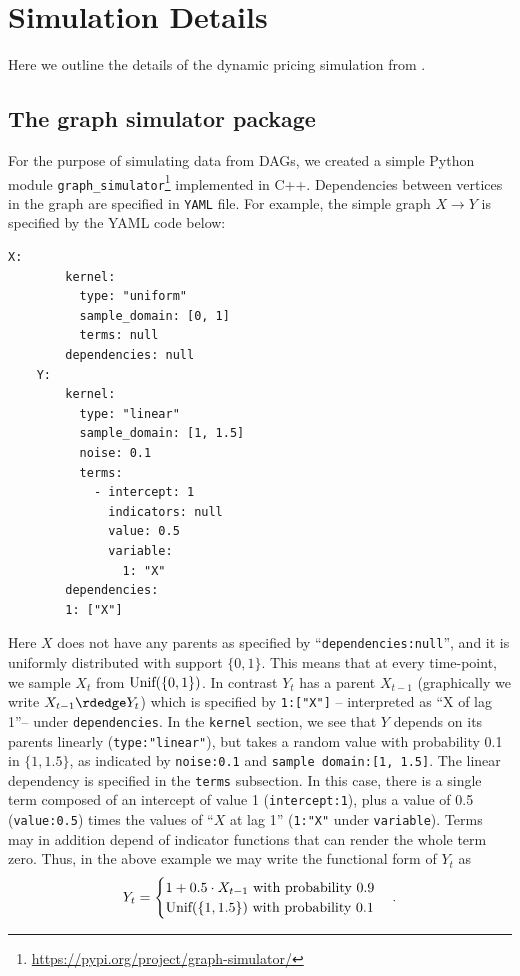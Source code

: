 \documentclass[12pt,a4paper]{article}
\theoremstyle{definition}
\begin{document}

\section{Simulation Details}
Here we outline the details of the dynamic pricing simulation from .

\subsection{The graph simulator package}
For the purpose of simulating data from DAGs, we created a simple Python module \texttt{graph\_simulator}\footnote{\url{https://pypi.org/project/graph-simulator/}} implemented in C++. Dependencies between vertices in the graph are specified in \texttt{YAML} file. For example, the simple graph $X \rightarrow Y$ is specified by the YAML code below:
\begin{tcolorbox}[colframe=white, colback=white, boxrule=0mm, sharp corners=south]
    \begin{lstlisting}[basicstyle=\bfseries\ttfamily, frame=none, breaklines=true, keywordstyle=\color{blue}]
    X:
        kernel:
          type: "uniform"
          sample_domain: [0, 1]
          terms: null
        dependencies: null
    Y:
        kernel:
          type: "linear"
          sample_domain: [1, 1.5]
          noise: 0.1
          terms:
            - intercept: 1
              indicators: null
              value: 0.5
              variable:
                1: "X"
        dependencies:
        1: ["X"]
    \end{lstlisting}
\end{tcolorbox}
Here $X$ does not have any parents as specified by ``\texttt{dependencies:null}'', and it is uniformly distributed with support $\{0, 1\}$. This means that at every time-point, we sample $X_t$ from $\textup{Unif}(\{0, 1\})$. In contrast $Y_t$ has a parent $X_{t-1}$ (graphically we write $X_{t-1} \rdedge Y_t$) which is specified by \texttt{1:["X"]} -- interpreted as ``X of lag 1''-- under \texttt{dependencies}. In the \texttt{kernel} section, we see that $Y$ depends on its parents linearly (\texttt{type:"linear"}), but takes a random value with probability 0.1 in $\{1, 1.5\}$, as indicated by \texttt{noise:0.1} and \texttt{sample domain:[1, 1.5]}. The linear dependency is specified in the \texttt{terms} subsection. In this case, there is a single term composed of an intercept of value 1 (\texttt{intercept:1}), plus a value of 0.5 (\texttt{value:0.5}) times the values of ``$X$ at lag 1'' (\texttt{1:"X"} under \texttt{variable}). Terms may in addition depend of indicator functions that can render the whole term zero. Thus, in the above example we may write the functional form of $Y_t$ as
\[
    Y_t =
    \begin{cases}
        1 + 0.5 \cdot X_{t-1} ~ \textup{with probability} ~ 0.9 \\
        \textup{Unif}(\{1, 1.5\}) ~ \textup{with probability} ~ 0.1
    \end{cases}.
\]
\end{document}
